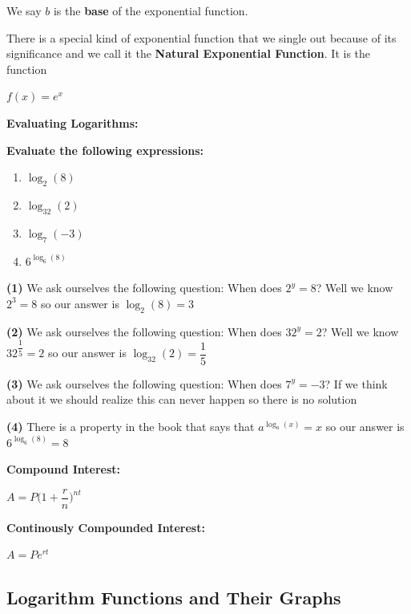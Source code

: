 \documentclass[12pt]{article}
\newenvironment{myindentpar}[1]%
     {\begin{list}{}%
             {\setlength{\leftmargin}{#1}}%
             \item[]%
     }
     {\end{list}}
\begin{document}
We say $b$ is the \textbf{base} of the exponential function.

There is a special kind of exponential function that we single out because of its significance and we call it the \textbf{Natural Exponential Function}. It is the function

\centerline{$f(x) = e^{x}$}

\newpage

\textbf{Evaluating Logarithms:}

\begin{myindentpar}{1cm}

\textbf{Evaluate the following expressions:}

\begin{enumerate}
\item $\log_{2}(8)$ 
\item $\log_{32}(2)$
\item $\log_{7}(-3)$
\item $6^{\log_{6}(8)}$

\end{enumerate}

\textbf{(1)} We ask ourselves the following question: When does $2^{y} = 8$? Well we know $2^{3} = 8$ so our answer is $\log_{2}(8) = 3$ 

\textbf{(2)} We ask ourselves the following question: When does $32^{y} = 2$? Well we know $32^{\dfrac{1}{5}} = 2$ so our answer is $\log_{32}(2) = \dfrac{1}{5}$ 

\textbf{(3)} We ask ourselves the following question: When does $7^{y} = -3$? If we think about it we should realize this can never happen so there is no solution

\textbf{(4)} There is a property in the book that says that $a^{\log_{a}(x)} = x$ so our answer is $6^{\log_{6}(8)} = 8$
\end{myindentpar}

\vspace{1cm}

\textbf{Compound Interest:}

\centerline{$A = P\Big(1 + \dfrac{r}{n}\Big)^{nt}$}

\vspace{1cm}

\textbf{Continously Compounded Interest:}

\centerline{$A = Pe^{rt}$}

\newpage

\subsection{Logarithm Functions and Their Graphs}
\end{document}
